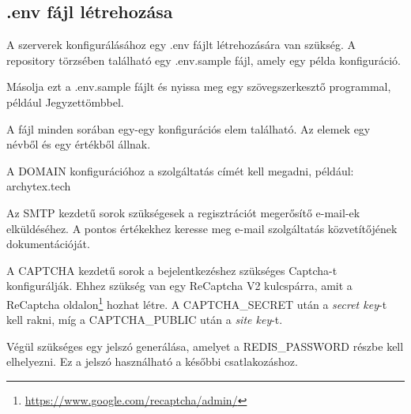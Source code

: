 \subsection{.env fájl létrehozása}
\label{config}

A szerverek konfigurálásához egy .env fájlt létrehozására van szükség. A repository törzsében található egy .env.sample fájl, amely egy példa konfiguráció.

Másolja ezt a .env.sample fájlt és nyissa meg egy szövegszerkesztő programmal, például Jegyzettömbbel.

A fájl minden sorában egy-egy konfigurációs elem található. Az elemek egy névből és egy értékből állnak.

A DOMAIN konfigurációhoz a szolgáltatás címét kell megadni, például: archytex.tech

Az SMTP kezdetű sorok szükségesek a regisztrációt megerősítő e-mail-ek elküldéséhez. A pontos értékekhez keresse meg e-mail szolgáltatás közvetítőjének dokumentációját.

A CAPTCHA kezdetű sorok a bejelentkezéshez szükséges Captcha-t konfigurálják. Ehhez szükség van egy ReCaptcha V2 kulcspárra, amit a ReCaptcha oldalon\footnote{\url{https://www.google.com/recaptcha/admin/}} hozhat létre. A CAPTCHA\_SECRET után a \emph{secret key}-t kell rakni, míg a CAPTCHA\_PUBLIC után a \emph{site key}-t.

Végül szükséges egy jelszó generálása, amelyet a REDIS\_PASSWORD részbe kell elhelyezni. Ez a jelszó használható a későbbi csatlakozáshoz.